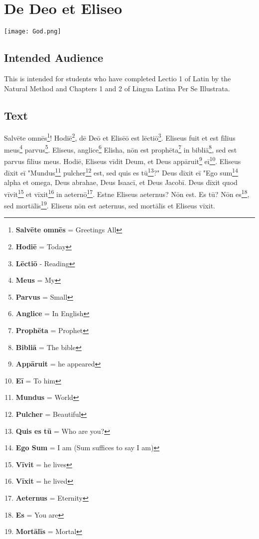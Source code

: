 \chapter{De Deo et Eliseo}
\begin{center}
\texttt{[image: God.png]}
\end{center}

\section{Intended Audience}
This is intended for students who have completed Lectio 1 of Latin by the Natural Method and Chapters 1 and 2 of Lingua Latina Per Se Illustrata.

\section{Text}
Salvēte omnēs\footnote{\textbf{Salvēte omnēs} = Greetings All}! Hodiē\footnote{\textbf{Hodiē} = Today}, dē Deō et Elisēō est lēctiō\footnote{\textbf{Lēctiō} - Reading}. Eliseus fuit et est fīlius meus\footnote{\textbf{Meus} = My} parvus\footnote{\textbf{Parvus} = Small}. Eliseus, anglice\footnote{\textbf{Anglice} = In English} Elisha, nōn est prophēta\footnote{\textbf{Prophēta} = Prophet} in bibliā\footnote{\textbf{Bibliā} = The bible}, sed est parvus fīlius meus. Hodiē, Eliseus vīdit Deum, et Deus appāruit\footnote{\textbf{Appāruit} = he appeared} eī\footnote{\textbf{Eī} = To him}. Eliseus dīxit eī "Mundus\footnote{\textbf{Mundus} = World} pulcher\footnote{\textbf{Pulcher} = Beautiful} est, sed quis es tū\footnote{\textbf{Quis es tū} = Who are you?}?" Deus dīxit eī "Ego sum\footnote{\textbf{Ego Sum} = I am (Sum suffices to say I am)} alpha et omega, Deus abrahae, Deus Isaacī, et Deus Jacobī. Deus dīxit quod vīvit\footnote{\textbf{Vīvit} = he lives} et vīxit\footnote{\textbf{Vīxit} = he lived} in aeternō\footnote{\textbf{Aeternus} = Eternity}. Estne Eliseus aeternus? Nōn est. Es tū? Nōn es\footnote{\textbf{Es} = You are}, sed mortālīs\footnote{\textbf{Mortālīs} = Mortal}. Eliseus nōn est aeternus, sed mortālīs et Eliseus vīxit. \par
